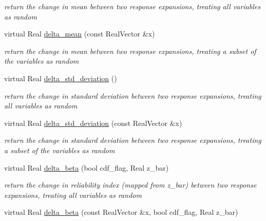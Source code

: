 \begin{DoxyCompactItemize}
\begin{DoxyCompactList}\small\item\em return the change in mean between two response expansions, treating all variables as random \end{DoxyCompactList}\item 
virtual Real \hyperlink{classPecos_1_1PolynomialApproximation_a47a27e963aa71bb3dfc2aa623f7f3e92}{delta\+\_\+mean} (const Real\+Vector \&x)\label{classPecos_1_1PolynomialApproximation_a47a27e963aa71bb3dfc2aa623f7f3e92}

\begin{DoxyCompactList}\small\item\em return the change in mean between two response expansions, treating a subset of the variables as random \end{DoxyCompactList}\item 
virtual Real \hyperlink{classPecos_1_1PolynomialApproximation_a91067291a8c8ca1f582e24706aac5ea7}{delta\+\_\+std\+\_\+deviation} ()\label{classPecos_1_1PolynomialApproximation_a91067291a8c8ca1f582e24706aac5ea7}

\begin{DoxyCompactList}\small\item\em return the change in standard deviation between two response expansions, treating all variables as random \end{DoxyCompactList}\item 
virtual Real \hyperlink{classPecos_1_1PolynomialApproximation_a4755135ffbf0475a447f71d7b782afa8}{delta\+\_\+std\+\_\+deviation} (const Real\+Vector \&x)\label{classPecos_1_1PolynomialApproximation_a4755135ffbf0475a447f71d7b782afa8}

\begin{DoxyCompactList}\small\item\em return the change in standard deviation between two response expansions, treating a subset of the variables as random \end{DoxyCompactList}\item 
virtual Real \hyperlink{classPecos_1_1PolynomialApproximation_af4a1a73ea647b8989096db81a7e36278}{delta\+\_\+beta} (bool cdf\+\_\+flag, Real z\+\_\+bar)\label{classPecos_1_1PolynomialApproximation_af4a1a73ea647b8989096db81a7e36278}

\begin{DoxyCompactList}\small\item\em return the change in reliability index (mapped from z\+\_\+bar) between two response expansions, treating all variables as random \end{DoxyCompactList}\item 
virtual Real \hyperlink{classPecos_1_1PolynomialApproximation_ad878382953dfa3146f4862f6195ea351}{delta\+\_\+beta} (const Real\+Vector \&x, bool cdf\+\_\+flag, Real z\+\_\+bar)\label{classPecos_1_1PolynomialApproximation_ad878382953dfa3146f4862f6195ea351}


\end{DoxyCompactItemize}
